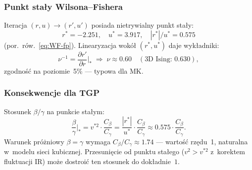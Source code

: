 \subsubsection{Punkt sta\l{}y Wilsona--Fishera}

Iteracja $(r, u) \to (r', u')$ posiada nietrywialny punkt
sta\l{}y:
\begin{equation}\label{eq:B-WF}
  \boxed{
    r^* = -2.251, \quad u^* = 3.917, \quad
    |r^*|/u^* = 0.575
  }
\end{equation}
(por.\ r\'ow.~\ref{eq:WF-fp}).
Linearyzacja wok\'o\l{} $(r^*, u^*)$ daje wyk\l{}adniki:
\begin{equation}\label{eq:B-exponents}
  \nu^{-1} = \frac{\partial r'}{\partial r}\biggr|_{*}
  \;\Rightarrow\; \nu \approx 0.60
  \quad (\text{3D Ising: } 0.630),
\end{equation}
zgodno\'s\'c na poziomie~5\% --- typowa dla MK.

\subsubsection{Konsekwencje dla TGP}

Stosunek $\beta/\gamma$ na punkcie sta\l{}ym:
\begin{equation}\label{eq:B-bg-ratio}
  \frac{\beta}{\gamma}\biggr|_{*}
  = v^{*2}\cdot\frac{C_\beta}{C_\gamma}
  = \frac{|r^*|}{u^*}\cdot\frac{C_\beta}{C_\gamma}
  \approx 0.575 \cdot \frac{C_\beta}{C_\gamma}.
\end{equation}
Warunek pr\'o\.zniowy $\beta = \gamma$ wymaga
$C_\beta/C_\gamma \approx 1.74$ --- warto\'s\'c rz\k{e}du~1,
naturalna w~modelu sieci kubicznej.
Przesuni\k{e}cie od punktu sta\l{}ego ($v^2 > v^{*2}$
z~korektem fluktuacji IR) mo\.ze dostroi\'c ten stosunek
do dok\l{}adnie~$1$.

